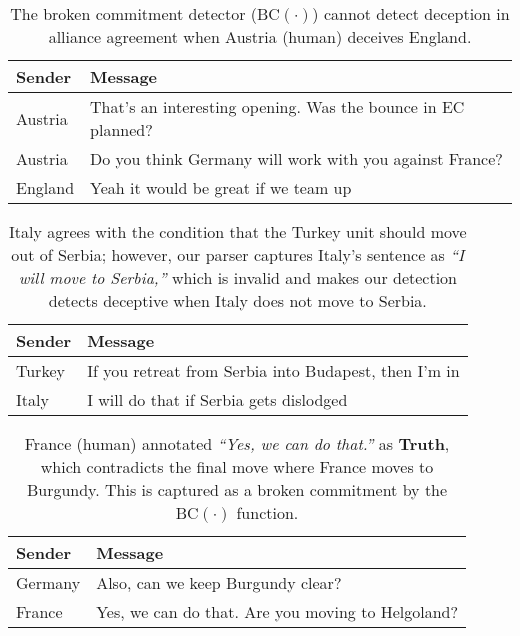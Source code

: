 \begin{table}
    \centering
    \begin{tabular}{p{1.2cm}p{5.5cm}}
    \hline
    \textbf{Sender} & \textbf{Message}   \\ 
    \hline
     Austria & \small{That's an interesting opening. Was the bounce in EC planned?} \\ 
      Austria & \small{Do you think Germany will work with you against France?} \\ 
    \rowcolor{grayish}  %
    England & \small{Yeah it would be great if we team up} \\
    \end{tabular}
    \caption{The broken commitment detector ($\text{BC}(\cdot)$) cannot detect deception in alliance agreement when Austria (human) deceives England.}
    \label{fig:alliance_2}
\end{table}

\begin{table}[t]
    \centering
    \begin{tabular}{p{1.2cm}p{5.5cm}}
    \hline
    \textbf{Sender} & \textbf{Message}   \\ 
    \hline
     Turkey & \small{If you retreat from Serbia into Budapest, then I'm in} \\ 
    \rowcolor{grayish}  %
    Italy & \small{I will do that if Serbia gets dislodged} \\
    \end{tabular}
    \caption{Italy agrees with the condition that the Turkey unit should move out of Serbia; however, our  parser captures Italy's sentence as \textit{``I will move to Serbia,''} which is invalid and makes our detection detects deceptive when Italy does not move to Serbia.}
    \label{fig:invalid_amr}
\end{table}

\begin{table}[t]
    \centering
    \begin{tabular}{p{1.2cm}p{5.5cm}}
    \hline
    \textbf{Sender} & \textbf{Message}   \\ 
    \hline
     Germany & \small{Also, can we keep Burgundy clear?} \\ 
    \rowcolor{grayish}  %
    France & \small{Yes, we can do that. Are you moving to Helgoland?} \\
    \end{tabular}
    \caption{France (human) annotated \textit{``Yes, we can do that.''} as \textbf{Truth}, which contradicts the final move where France moves to Burgundy. This is captured as a broken commitment by the $\text{BC}(\cdot)$ function.}
    \label{fig:lie_annotation}
\end{table}

